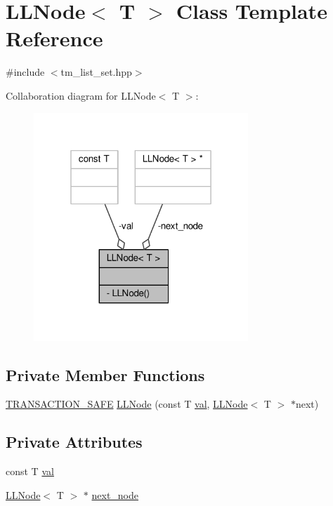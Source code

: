 \hypertarget{classLLNode}{\section{L\-L\-Node$<$ T $>$ Class Template Reference}
\label{classLLNode}
}


{\ttfamily \#include $<$tm\-\_\-list\-\_\-set.\-hpp$>$}



Collaboration diagram for L\-L\-Node$<$ T $>$\-:
\nopagebreak
\begin{figure}[H]
\begin{center}
\leavevmode
\includegraphics[width=229pt]{classLLNode__coll__graph}
\end{center}
\end{figure}
\subsection*{Private Member Functions}
\begin{DoxyCompactItemize}
\item 
\hyperlink{common_8hpp_a77872cb9748b204f4b1c44ba6141b862}{T\-R\-A\-N\-S\-A\-C\-T\-I\-O\-N\-\_\-\-S\-A\-F\-E} \hyperlink{classLLNode_af1c99976654e036686c38d6d2ed7d229}{L\-L\-Node} (const T \hyperlink{classLLNode_ae57852f5450e75c2d65fb91833fff950}{val}, \hyperlink{classLLNode}{L\-L\-Node}$<$ T $>$ $\ast$next)
\end{DoxyCompactItemize}
\subsection*{Private Attributes}
\begin{DoxyCompactItemize}
\item 
const T \hyperlink{classLLNode_ae57852f5450e75c2d65fb91833fff950}{val}
\item 
\hyperlink{classLLNode}{L\-L\-Node}$<$ T $>$ $\ast$ \hyperlink{classLLNode_a62d7ac55016f8831538563aaaf86e140}{next\-\_\-node}
\end{DoxyCompactItemize}
